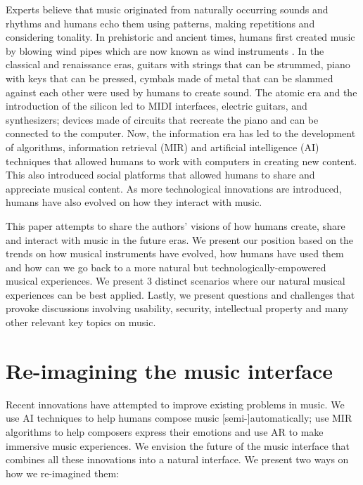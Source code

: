 \documentclass[acmtog]{acmart}
\begin{document}
Experts believe that music originated from naturally occurring sounds and rhythms and humans echo them using patterns, making repetitions and considering tonality. In prehistoric and ancient times, humans first created music by blowing wind pipes which are now known as wind instruments \cite{conard2009female}. In the classical and renaissance eras, guitars with strings that can be strummed, piano with keys that can be pressed, cymbals made of metal that can be slammed against each other were used by humans to create sound. The atomic era and the introduction of the silicon led to MIDI interfaces, electric guitars, and synthesizers; devices made of circuits that recreate the piano and can be connected to the computer. Now, the information era has led to the development of algorithms, information retrieval (MIR) and artificial intelligence (AI) techniques that allowed humans to work with computers in creating new content. This also introduced social platforms that allowed humans to share and appreciate musical content. As more technological innovations are introduced, humans have also evolved on how they interact with music. 

This paper attempts to share the authors' visions of how humans create, share and interact with music in the future eras. We present our position based on the trends on how musical instruments have evolved, how humans have used them and how can we go back to a more natural but technologically-empowered musical experiences. We present 3 distinct scenarios where our natural musical experiences can be best applied. Lastly, we present questions and challenges that provoke discussions involving usability, security, intellectual property and many other relevant key topics on music. 


\section{Re-imagining the music interface}
Recent innovations have attempted to improve existing problems in music. We use AI techniques to help humans compose music [semi-]automatically; use MIR algorithms to help composers express their emotions and use AR to make immersive music experiences. We envision the future of the music interface that combines all these innovations into a natural interface. We present two ways on how we re-imagined them: 
\end{document}
